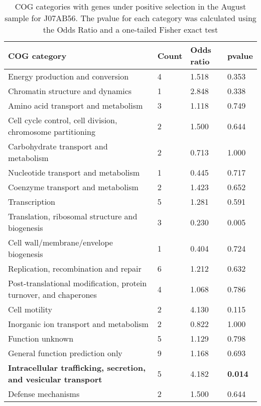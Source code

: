 \begin{table}[hb]
\footnotesize 
	\tabcolsep=0.11cm 
\caption{COG categories with genes under positive selection in the August sample for J07AB56. The pvalue for each category was calculated using the Odds Ratio and a one-tailed Fisher exact test \\} 
\begin{tabularx}{\textwidth}{L{6cm}R{2cm}R{2cm}R{2cm}} 
\hline 
\textbf{COG category} & \textbf{Count} & \textbf{Odds ratio} & \textbf{pvalue} \\ 
\hline 
Energy production and conversion & 4 & 1.518 & 0.353 \\ 
Chromatin structure and dynamics & 1 & 2.848 & 0.338 \\ 
Amino acid transport and metabolism & 3 & 1.118 & 0.749 \\ 
Cell cycle control, cell division, chromosome partitioning & 2 & 1.500 & 0.644 \\ 
Carbohydrate transport and metabolism & 2 & 0.713 & 1.000 \\ 
Nucleotide transport and metabolism & 1 & 0.445 & 0.717 \\ 
Coenzyme transport and metabolism & 2 & 1.423 & 0.652 \\ 
Transcription & 5 & 1.281 & 0.591 \\ 
Translation, ribosomal structure and biogenesis & 3 & 0.230 & 0.005 \\ 
Cell wall/membrane/envelope biogenesis & 1 & 0.404 & 0.724 \\ 
Replication, recombination and repair & 6 & 1.212 & 0.632 \\ 
Post-translational modification, protein turnover, and chaperones & 4 & 1.068 & 0.786 \\ 
Cell motility & 2 & 4.130 & 0.115 \\ 
Inorganic ion transport and metabolism & 2 & 0.822 & 1.000 \\ 
Function unknown & 5 & 1.129 & 0.798 \\ 
General function prediction only & 9 & 1.168 & 0.693 \\ 
\textbf{Intracellular trafficking, secretion, and vesicular transport} & 5 & 4.182 & \textbf{0.014} \\ 
Defense mechanisms & 2 & 1.500 & 0.644 \\ 
\end{tabularx} 
\label{August_COG_Selection_J07AB56} 
 \end{table} 


